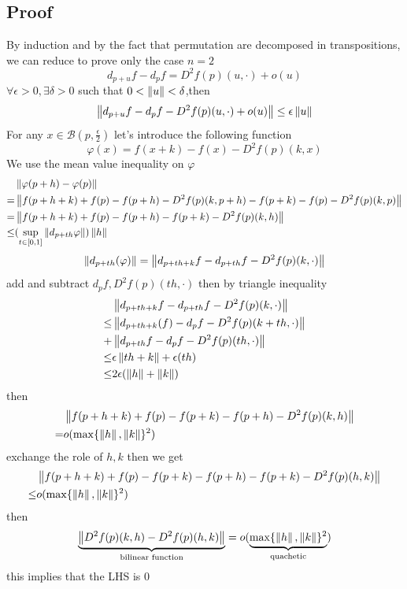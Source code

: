 \documentclass{book}
\begin{document}
 \subsection*{Proof}
 By induction and by the fact that permutation are decomposed in transpositions, we can reduce to prove only the case $n=2$
 $$d_{p+u}f-d_pf=D^2f(p)(u,\cdot)+o(u)$$
 $\forall \epsilon>0,\exists\delta>0$ such that $0<\left\lVert u \right\rVert<\delta$,then 
 $$\left\lVert d_{p+u}f-d_pf-D^2f(p)(u,\cdot)+o(u) \right\rVert\leq\epsilon\left\lVert u \right\rVert$$
For any $x\in \mathcal{B}(p,\frac{\epsilon}{2})$ let's introduce the following function
$$\varphi(x)=f(x+k)-f(x)-D^2f(p)(k,x)$$
We use the mean value inequality on $\varphi$
$$
\begin{aligned}
&\left\lVert \varphi(p+h)-\varphi(p) \right\rVert\\
= &\left\lVert f(p+h+k)+f(p)-f(p+h)-D^2f(p)(k,p+h)-f(p+k)-f(p)-D^2f(p)(k,p) \right\rVert\\
=& \left\lVert f(p+h+k)+f(p)-f(p+h)-f(p+k)-D^2f(p)(k,h) \right\rVert\\
\leq &(\sup\limits_{t\in [0,1]}\left\lVert d_{p+th}\varphi \right\rVert)\left\lVert h \right\rVert
\end{aligned}
$$
$$\begin{aligned}
    \left\lVert d_{p+th}(\varphi) \right\rVert=\left\lVert d_{p+th+k}f-d_{p+th}f-D^2f(p)(k,\cdot) \right\rVert
\end{aligned}$$
add and subtract $d_pf,D^2f(p)(th,\cdot)$ then by triangle inequality
$$
\begin{aligned}
    &\left\lVert d_{p+th+k}f-d_{p+th}f-D^2f(p)(k,\cdot) \right\rVert\\
    \leq &\left\lVert d_{p+th+k}(f)-d_pf-D^2f(p)(k+th,\cdot) \right\rVert\\
    + &\left\lVert d_{p+th}f-d_pf-D^2f(p)(th,\cdot) \right\rVert\\
    \leq &\epsilon\left\lVert th+k \right\rVert+\epsilon(th)\\
    \leq &2\epsilon(\left\lVert h \right\rVert+\left\lVert k \right\rVert)
\end{aligned}$$
then 
$$
\begin{aligned}
    &\left\lVert f(p+h+k)+f(p)-f(p+k)-f(p+h)-D^2f(p)(k,h) \right\rVert
    \\= &o(\max\{\left\lVert h \right\rVert,\left\lVert k \right\rVert\}^2)
\end{aligned}
$$
exchange the role of $h,k$ then we get 
$$
\begin{aligned}
    &\left\lVert f(p+h+k)+f(p)-f(p+k)-f(p+h)-f(p+k)-D^2f(p)(h,k) \right\rVert
    \\ \leq &o(\max\{\left\lVert h \right\rVert,\left\lVert k \right\rVert\}^2)
\end{aligned}$$
then $$\underbrace{\left\lVert D^2f(p)(k,h)-D^2f(p)(h,k) \right\rVert}\limits_{\text{bilinear function}}=o(\underbrace{\max\{\left\lVert h \right\rVert,\left\lVert k \right\rVert\}^2}\limits_{\text{quachetic}})$$
this implies that the LHS is 0
\end{document}
